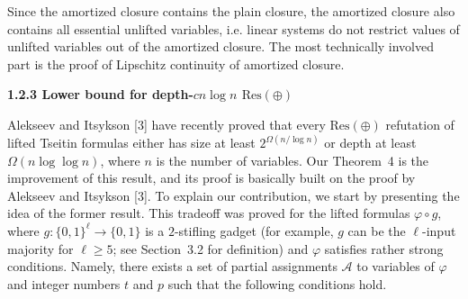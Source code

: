 Since the amortized closure contains the plain closure, the amortized closure also contains all essential unlifted variables, i.e.
linear systems do not restrict values of unlifted variables out of the amortized closure. The most technically involved part is the proof of Lipschitz continuity of amortized closure.\par


\par\medskip\noindent\textbf{
1.2.3 Lower bound for depth-$cn\log n$ $\mathrm{Res}(\oplus)$
}\par


Alekseev and Itsykson [3] have recently proved that every $\mathrm{Res}(\oplus)$ refutation of lifted Tseitin formulas either has size at least $2^{\Omega(n/\log n)}$ or depth at least $\Omega(n\log\log n)$, where $n$ is the number of variables. Our Theorem 4 is the improvement of this result, and its proof is basically built on the proof by Alekseev and Itsykson [3]. To explain our contribution, we start by presenting the idea of the former result.
This tradeoff was proved for the lifted formulas $\varphi\circ g$, where $g:\{0,1\}^{\ell}\to\{0,1\}$ is a $2$-stifling gadget (for example, $g$ can be the $\ell$-input majority for $\ell\geq 5$; see Section 3.2 for definition) and $\varphi$ satisfies rather strong conditions. Namely, there exists a set of partial assignments $\mathcal{A}$ to variables of $\varphi$ and integer numbers $t$ and $p$ such that the following conditions hold.\par


